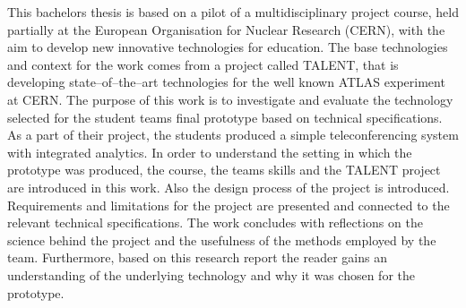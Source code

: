 \documentclass[english,12pt,a4paper,pdftex]{article}
\begin{document}

\makecoverpage

\begin{abstractpage}[english]

This bachelors thesis is based on a pilot of a multidisciplinary project course, held partially at the European Organisation for Nuclear Research (CERN), with the aim to develop new innovative technologies for education. The base technologies and context for the work comes from a project called TALENT, that is developing state--of--the--art technologies for the well known ATLAS experiment at CERN. The purpose of this work is to investigate and evaluate the technology selected for the student teams final prototype based on technical specifications. As a part of their project, the students produced a simple teleconferencing system with integrated analytics. In order to understand the setting in which the prototype was produced, the course, the teams skills and the TALENT project are introduced in this work. Also the design process of the project is introduced. Requirements and limitations for the project are presented and connected to the relevant technical specifications. The work concludes with reflections on the science behind the project and the usefulness of the methods employed by the team. Furthermore, based on this research report the reader gains an understanding of the underlying technology and why it was chosen for the prototype.


\end{abstractpage}
\end{document}
